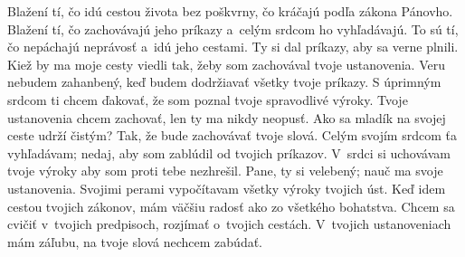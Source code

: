 Blažení tí, čo idú cestou života bez poškvrny,
čo kráčajú podľa zákona Pánovho.
\versseparator
Blažení tí, čo zachovávajú jeho príkazy
a~celým srdcom ho vyhľadávajú.
\versseparator
To sú tí, čo nepáchajú neprávosť
a~idú jeho cestami.
\versseparator
Ty si dal príkazy,
aby sa verne plnili.
\versseparator
Kiež by ma moje cesty viedli tak,
žeby som zachovával tvoje ustanovenia.
\versseparator
Veru nebudem zahanbený,
keď budem dodržiavať všetky tvoje príkazy.
\versseparator
S úprimným srdcom ti chcem ďakovať,
že som poznal tvoje spravodlivé výroky.
\versseparator
Tvoje ustanovenia chcem zachovať,
len ty ma nikdy neopusť.
\versseparator
Ako sa mladík na svojej ceste udrží čistým?
Tak, že bude zachovávať tvoje slová.
\versseparator
Celým svojím srdcom ťa vyhľadávam;
nedaj, aby som zablúdil od tvojich príkazov.
\versseparator
V~srdci si uchovávam tvoje výroky
aby som proti tebe nezhrešil.
\versseparator
Pane, ty si velebený;
nauč ma svoje ustanovenia.
\versseparator
Svojimi perami
vypočítavam všetky výroky tvojich úst.
\versseparator
Keď idem cestou tvojich zákonov, mám väčšiu radosť
ako zo všetkého bohatstva.
\versseparator
Chcem sa cvičiť v~tvojich predpisoch,
rozjímať o~tvojich cestách.
\versseparator
V~tvojich ustanoveniach mám záľubu,
na tvoje slová nechcem zabúdať.